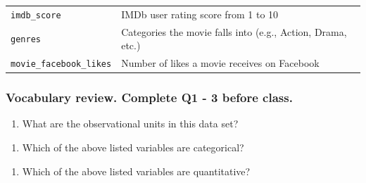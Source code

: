 \documentclass[
]{report}
\providecommand{\tightlist}{%
  \setlength{\itemsep}{0pt}\setlength{\parskip}{0pt}}
\begin{document}
\begin{longtable}[]{@{}ll@{}}
\begin{minipage}[t]{0.22\columnwidth}\raggedright
\texttt{imdb\_score}\strut
\end{minipage} & \begin{minipage}[t]{0.72\columnwidth}\raggedright
IMDb user rating score from 1 to 10\strut
\end{minipage}\tabularnewline
\begin{minipage}[t]{0.22\columnwidth}\raggedright
\texttt{genres}\strut
\end{minipage} & \begin{minipage}[t]{0.72\columnwidth}\raggedright
Categories the movie falls into (e.g., Action, Drama, etc.)\strut
\end{minipage}\tabularnewline
\begin{minipage}[t]{0.22\columnwidth}\raggedright
\texttt{movie\_facebook\_likes}\strut
\end{minipage} & \begin{minipage}[t]{0.72\columnwidth}\raggedright
Number of likes a movie receives on Facebook\strut
\end{minipage}\tabularnewline
\bottomrule
\end{longtable}

\hypertarget{vocabulary-review.-complete-q1---3-before-class.}{%
\subsubsection*{Vocabulary review. Complete Q1 - 3 before class.}\label{vocabulary-review.-complete-q1---3-before-class.}}

\begin{enumerate}
\def\labelenumi{\arabic{enumi}.}
\tightlist
\item
  What are the observational units in this data set?
\end{enumerate}

\vspace{0.1in}

\begin{enumerate}
\def\labelenumi{\arabic{enumi}.}
\setcounter{enumi}{1}
\tightlist
\item
  Which of the above listed variables are categorical?
\end{enumerate}

\vspace{.5in}

\begin{enumerate}
\def\labelenumi{\arabic{enumi}.}
\setcounter{enumi}{2}
\tightlist
\item
  Which of the above listed variables are quantitative?
\end{enumerate}
\end{document}
